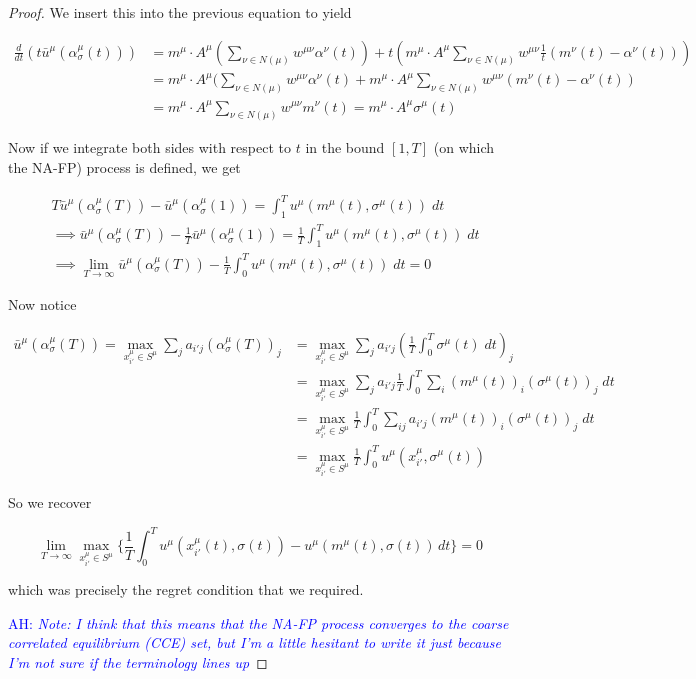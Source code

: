 \documentclass{article}
\theoremstyle{definition}
\newcommand{\ah}[1]{\textcolor{blue}{AH: \textit{#1}}}
\begin{document}
\begin{proof}
		We insert this into the previous equation to yield

		\begin{align}
			\frac{d}{dt} (t \bar{u}^\mu (\alpha_\sigma^\mu (t))) & = m^\mu \cdot A^\mu (\sum_{\nu \in N(\mu)} w^{\mu \nu} \alpha^\nu (t)) + t(m^\mu \cdot A^\mu \sum_{\nu \in N(\mu)} w^{\mu \nu} \frac{1}{t} (m^\nu(t) - \alpha^\nu (t))) \\
			& = m^\mu \cdot A^\mu (\sum_{\nu \in N(\mu)} w^{\mu \nu} \alpha^\nu (t) + m^\mu \cdot A^\mu \sum_{\nu \in N(\mu)} w^{\mu \nu} (m^\nu(t) - \alpha^\nu (t)) \\
			& = m^\mu \cdot A^\mu \sum_{\nu \in N(\mu)} w^{\mu \nu} m^\nu(t) = m^\mu \cdot A^\mu \sigma^\mu(t) 
		\end{align}


		Now if we integrate both sides with respect to $t$ in the bound $[1, T]$ (on which the NA-FP) process is defined, we get

		\begin{align}
			&  T \bar{u}^\mu (\alpha_\sigma^\mu (T)) - \bar{u}^\mu (\alpha_\sigma^\mu (1)) = \int_1^T u^\mu (m^\mu(t), \sigma^\mu(t)) \; dt \\
			& \implies \bar{u}^\mu (\alpha_\sigma^\mu (T)) - \frac{1}{T} \bar{u}^\mu (\alpha_\sigma^\mu (1)) = \frac{1}{T} \int_1^T u^\mu (m^\mu(t), \sigma^\mu(t)) \; dt \\
			& \implies \lim_{T \rightarrow \infty} \bar{u}^\mu (\alpha_\sigma^\mu (T)) - \frac{1}{T} \int_0^T u^\mu (m^\mu(t), \sigma^\mu(t)) \; dt = 0
		\end{align}

		Now notice

		\begin{align}
			\bar{u}^\mu (\alpha_\sigma^\mu (T)) = \max_{x^\mu_{i'} \in S^\mu} \sum_{j} a_{i'j} (\alpha_{\sigma}^\mu (T))_j & = \max_{x^\mu_{i'} \in S^\mu} \sum_{j} a_{i'j} (\frac{1}{T} \int_{0}^{T} \sigma^\mu(t) \; dt)_j \\
			& = \max_{x^\mu_{i'} \in S^\mu} \sum_{j} a_{i'j} \frac{1}{T} \int_{0}^{T} \sum_i (m^\mu (t))_i (\sigma^\mu(t))_j \; dt\\
			& = \max_{x^\mu_{i'} \in S^\mu} \frac{1}{T} \int_0^T \sum_{ij} a_{i'j} (m^\mu (t))_i (\sigma^\mu(t))_j \; dt\\
			& = \max_{x^\mu_{i'} \in S^\mu} \frac{1}{T} \int_0^T u^\mu(x^\mu_{i'}, \sigma^\mu(t))
		\end{align}

		So we recover

		\begin{equation}
			\lim_{T \rightarrow \infty} \max_{x_{i'}^\mu \in S^\mu} \Big\{ \frac{1}{T} \int_{0}^{T} u^{\mu}(x_{i'}^\mu(t), \sigma(t)) - u^{\mu}(m^\mu(t), \sigma(t)) \, dt \Big\} = 0
		\end{equation}

		which was precisely the regret condition that we required.

		\ah{Note: I think that this means that the NA-FP process converges to the coarse correlated equilibrium (CCE) set, but I'm a little hesitant to write it just because I'm not sure if the terminology lines up}
	\end{proof}
\end{document}
